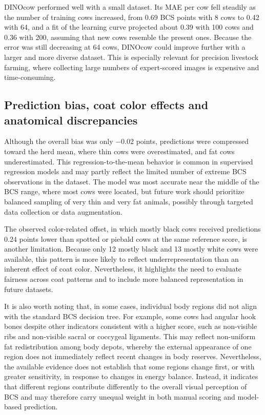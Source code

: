 DINOcow performed well with a small dataset.
Its MAE per cow fell steadily as the number of training cows increased, from 0.69 BCS points with 8 cows to 0.42 with 64, and a fit of the learning curve projected about 0.39 with 100 cows and 0.36 with 200, assuming that new cows resemble the present ones.
Because the error was still decreasing at 64 cows, DINOcow could improve further with a larger and more diverse dataset.
This is especially relevant for precision livestock farming, where collecting large numbers of expert-scored images is expensive and time-consuming.

\subsection{Prediction bias, coat color effects and anatomical discrepancies}

Although the overall bias was only $-$0.02 points, predictions were compressed toward the herd mean, where thin cows were overestimated, and fat cows underestimated.
This regression-to-the-mean behavior is common in supervised regression models and may partly reflect the limited number of extreme BCS observations in the dataset.
The model was most accurate near the middle of the BCS range, where most cows were located, but future work should prioritize balanced sampling of very thin and very fat animals, possibly through targeted data collection or data augmentation.

The observed color-related offset, in which mostly black cows received predictions 0.24 points lower than spotted or piebald cows at the same reference score, is another limitation.
Because only 12 mostly black and 13 mostly white cows were available, this pattern is more likely to reflect underrepresentation than an inherent effect of coat color.
Nevertheless, it highlights the need to evaluate fairness across coat patterns and to include more balanced representation in future datasets.

It is also worth noting that, in some cases, individual body regions did not align with the standard BCS decision tree.
For example, some cows had angular hook bones despite other indicators consistent with a higher score, such as non-visible ribs and non-visible sacral or coccygeal ligaments.
This may reflect non-uniform fat redistribution among body depots, whereby the external appearance of one region does not immediately reflect recent changes in body reserves.
Nevertheless, the available evidence does not establish that some regions change first, or with greater sensitivity, in response to changes in energy balance.
Instead, it indicates that different regions contribute differently to the overall visual perception of BCS and may therefore carry unequal weight in both manual scoring and model-based prediction.

